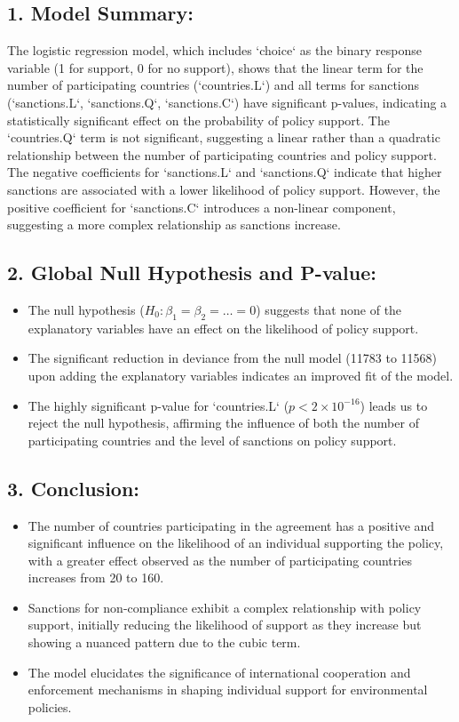 \documentclass[12pt,letterpaper]{article}
\begin{document}
\subsection*{1. Model Summary:}
The logistic regression model, which includes `choice` as the binary response variable (1 for support, 0 for no support), shows that the linear term for the number of participating countries (`countries.L`) and all terms for sanctions (`sanctions.L`, `sanctions.Q`, `sanctions.C`) have significant p-values, indicating a statistically significant effect on the probability of policy support. The `countries.Q` term is not significant, suggesting a linear rather than a quadratic relationship between the number of participating countries and policy support. The negative coefficients for `sanctions.L` and `sanctions.Q` indicate that higher sanctions are associated with a lower likelihood of policy support. However, the positive coefficient for `sanctions.C` introduces a non-linear component, suggesting a more complex relationship as sanctions increase.

\subsection*{2. Global Null Hypothesis and P-value:}
\begin{itemize}
   \item The null hypothesis ($H_0: \beta_1 = \beta_2 = \ldots = 0$) suggests that none of the explanatory variables have an effect on the likelihood of policy support.
   \item The significant reduction in deviance from the null model (11783 to 11568) upon adding the explanatory variables indicates an improved fit of the model.
   \item The highly significant p-value for `countries.L` ($p < 2 \times 10^{-16}$) leads us to reject the null hypothesis, affirming the influence of both the number of participating countries and the level of sanctions on policy support.
\end{itemize}

\subsection*{3. Conclusion:}
\begin{itemize}
   \item The number of countries participating in the agreement has a positive and significant influence on the likelihood of an individual supporting the policy, with a greater effect observed as the number of participating countries increases from 20 to 160.
   \item Sanctions for non-compliance exhibit a complex relationship with policy support, initially reducing the likelihood of support as they increase but showing a nuanced pattern due to the cubic term.
   \item The model elucidates the significance of international cooperation and enforcement mechanisms in shaping individual support for environmental policies.
\end{itemize}
\end{document}
